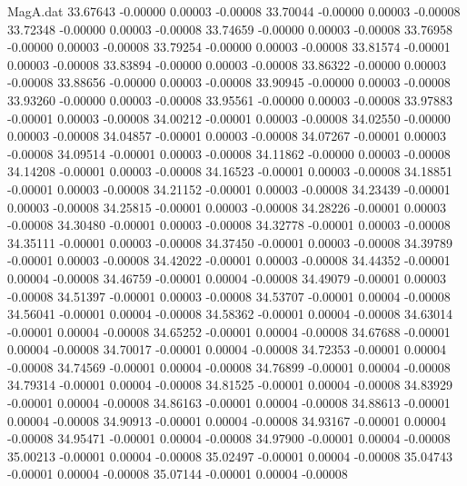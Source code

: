 \begin{filecontents}{MagA.dat}
  33.67643   -0.00000    0.00003   -0.00008
  33.70044   -0.00000    0.00003   -0.00008
  33.72348   -0.00000    0.00003   -0.00008
  33.74659   -0.00000    0.00003   -0.00008
  33.76958   -0.00000    0.00003   -0.00008
  33.79254   -0.00000    0.00003   -0.00008
  33.81574   -0.00001    0.00003   -0.00008
  33.83894   -0.00000    0.00003   -0.00008
  33.86322   -0.00000    0.00003   -0.00008
  33.88656   -0.00000    0.00003   -0.00008
  33.90945   -0.00000    0.00003   -0.00008
  33.93260   -0.00000    0.00003   -0.00008
  33.95561   -0.00000    0.00003   -0.00008
  33.97883   -0.00001    0.00003   -0.00008
  34.00212   -0.00001    0.00003   -0.00008
  34.02550   -0.00000    0.00003   -0.00008
  34.04857   -0.00001    0.00003   -0.00008
  34.07267   -0.00001    0.00003   -0.00008
  34.09514   -0.00001    0.00003   -0.00008
  34.11862   -0.00000    0.00003   -0.00008
  34.14208   -0.00001    0.00003   -0.00008
  34.16523   -0.00001    0.00003   -0.00008
  34.18851   -0.00001    0.00003   -0.00008
  34.21152   -0.00001    0.00003   -0.00008
  34.23439   -0.00001    0.00003   -0.00008
  34.25815   -0.00001    0.00003   -0.00008
  34.28226   -0.00001    0.00003   -0.00008
  34.30480   -0.00001    0.00003   -0.00008
  34.32778   -0.00001    0.00003   -0.00008
  34.35111   -0.00001    0.00003   -0.00008
  34.37450   -0.00001    0.00003   -0.00008
  34.39789   -0.00001    0.00003   -0.00008
  34.42022   -0.00001    0.00003   -0.00008
  34.44352   -0.00001    0.00004   -0.00008
  34.46759   -0.00001    0.00004   -0.00008
  34.49079   -0.00001    0.00003   -0.00008
  34.51397   -0.00001    0.00003   -0.00008
  34.53707   -0.00001    0.00004   -0.00008
  34.56041   -0.00001    0.00004   -0.00008
  34.58362   -0.00001    0.00004   -0.00008
  34.63014   -0.00001    0.00004   -0.00008
  34.65252   -0.00001    0.00004   -0.00008
  34.67688   -0.00001    0.00004   -0.00008
  34.70017   -0.00001    0.00004   -0.00008
  34.72353   -0.00001    0.00004   -0.00008
  34.74569   -0.00001    0.00004   -0.00008
  34.76899   -0.00001    0.00004   -0.00008
  34.79314   -0.00001    0.00004   -0.00008
  34.81525   -0.00001    0.00004   -0.00008
  34.83929   -0.00001    0.00004   -0.00008
  34.86163   -0.00001    0.00004   -0.00008
  34.88613   -0.00001    0.00004   -0.00008
  34.90913   -0.00001    0.00004   -0.00008
  34.93167   -0.00001    0.00004   -0.00008
  34.95471   -0.00001    0.00004   -0.00008
  34.97900   -0.00001    0.00004   -0.00008
  35.00213   -0.00001    0.00004   -0.00008
  35.02497   -0.00001    0.00004   -0.00008
  35.04743   -0.00001    0.00004   -0.00008
  35.07144   -0.00001    0.00004   -0.00008

\end{filecontents}

